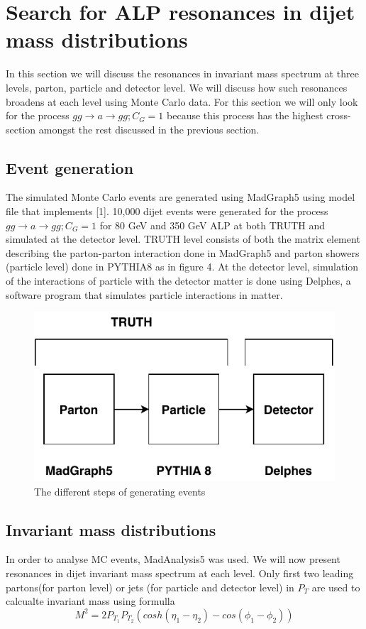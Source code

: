\documentclass[12pt,a4paper]{article}
\begin{document}
\section{Search for ALP resonances in dijet mass distributions}
In this section we will discuss the resonances in invariant mass spectrum at three levels, parton, particle and detector level. We will discuss how such resonances broadens at each level using Monte Carlo data. For this section we will only look for the process $gg \rightarrow a \rightarrow gg ;C_G =1 $ because this process has the highest cross-section amongst the rest discussed in the previous section.


\subsection{Event generation}
The simulated Monte Carlo events are generated using MadGraph5 using model file that implements [1]. 10,000 dijet events were generated for the process $gg \rightarrow a \rightarrow gg; C_G = 1 $ for 80 GeV and 350 GeV ALP at both TRUTH and simulated at the detector level. TRUTH level consists of both the matrix element describing the parton-parton interaction done in MadGraph5 and parton showers (particle level) done in PYTHIA8 as in figure 4. At the detector level, simulation of the interactions of particle with the detector matter is done using Delphes, a software program that simulates particle interactions in matter.

\begin{figure}[h!]
\centering\includegraphics[scale=0.8]{method.pdf}
\caption{The different steps of generating events}
\label{fig: figure4}
\end{figure}


\subsection{Invariant mass distributions}
In order to analyse MC events, MadAnalysis5 was used. We will now present resonances in dijet invariant mass spectrum at each level. Only first two leading partons(for parton level) or jets (for particle and detector level) in $P_T$ are used to calcualte invariant mass using formulla \\ 
$$M^2 = 2P_{{T}_{1}}P_{{T}_{2}}(cosh(\eta_{1} - \eta_{2})-cos(\phi_{1} - \phi_{2})) $$
\end{document}
